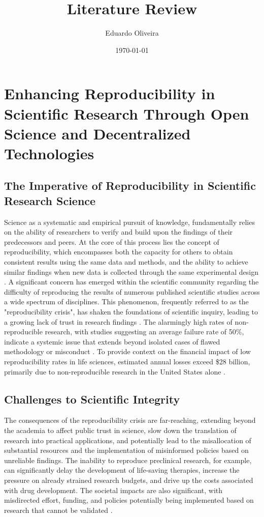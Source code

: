 \documentclass{article}
\title{Literature Review}
\author{Eduardo Oliveira}
\date{\today}
\begin{document}
\maketitle

\listoftodos


\section{Enhancing Reproducibility in Scientific Research Through Open Science and Decentralized Technologies}

\subsection{The Imperative of Reproducibility in Scientific Research Science}

Science as a systematic and empirical pursuit of knowledge, fundamentally relies on the ability of researchers to verify and build upon the findings of their predecessors and peers. At the core of this process lies the concept of reproducibility, which encompasses both the capacity for others to obtain consistent results using the same data and methods, and the ability to achieve similar findings when new data is collected through the same experimental design \cite{pellizzari_reproducibility_2017, committee_2019}. A significant concern has emerged within the scientific community regarding the difficulty of reproducing the results of numerous published scientific studies across a wide spectrum of disciplines. This phenomenon, frequently referred to as the "reproducibility crisis", has shaken the foundations of scientific inquiry, leading to a growing lack of trust in research findings \cite{baker2016reproducibility}. The alarmingly high rates of non-reproducible research, with studies suggesting an average failure rate of 50\%, indicate a systemic issue that extends beyond isolated cases of flawed methodology or misconduct \cite{branch_reproducibility_2019}. To provide context on the financial impact of low reproducibility rates in life sciences, estimated annual losses exceed \$28 billion, primarily due to non-reproducible research in the United States alone \cite{freedman2015economics}.

\subsection{Challenges to Scientific Integrity}

The consequences of the reproducibility crisis are far-reaching, extending beyond the academia to affect public trust in science, slow down the translation of research into practical applications, and potentially lead to the misallocation of substantial resources and the implementation of misinformed policies based on unreliable findings. The inability to reproduce preclinical research, for example, can significantly delay the development of life-saving therapies, increase the pressure on already strained research budgets, and drive up the costs associated with drug development. The societal impacts are also significant, with misdirected effort, funding, and policies potentially being implemented based on research that cannot be validated \cite{freedman2015economics}.
\end{document}
